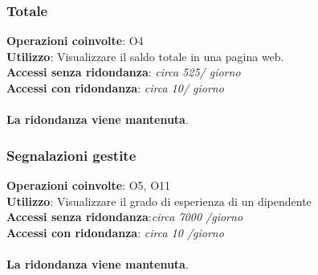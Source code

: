 \subsubsection{Totale}
\textbf{Operazioni coinvolte}: O4  \\
\textbf{Utilizzo}: Visualizzare il saldo totale in una pagina web.\\
\textbf{Accessi senza ridondanza}: \textit{circa 525/ giorno}\\
\textbf{Accessi con ridondanza}: \textit{circa 10/ giorno}\\\\
\textbf{La ridondanza viene mantenuta}.

\subsubsection{Segnalazioni gestite}
\textbf{Operazioni coinvolte}: O5, O11  \\
\textbf{Utilizzo}: Visualizzare il grado di esperienza di un dipendente\\
\textbf{Accessi senza ridondanza}:\textit{circa 7000 /giorno}\\
\textbf{Accessi con ridondanza}: \textit{circa 10 /giorno}\\\\
\textbf{La ridondanza viene mantenuta}.